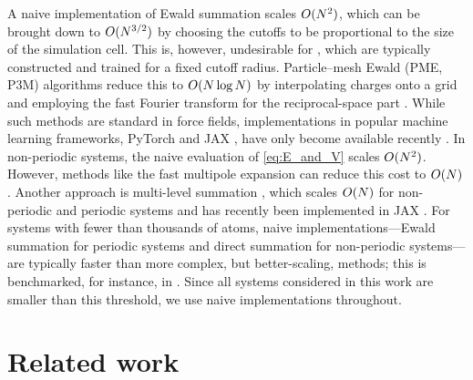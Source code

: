 \documentclass[10pt]{article} %
\begin{document}
% 
A naive implementation of Ewald summation scales $O(N^2)$, which can be brought down to $O(N^{3/2})$ by choosing the cutoffs to be proportional to the size of the simulation cell. 
This is, however, undesirable for \mlps, which are typically constructed and trained for a fixed cutoff radius.
Particle–mesh Ewald (PME, P3M) algorithms reduce this to $O(N \log N)$ by interpolating charges onto a grid and employing the fast Fourier transform for the reciprocal-space part \citep{dyp1993,he2021}.
While such methods are standard in force fields, implementations in popular machine learning frameworks, PyTorch \citep{pgmlbcklgadkydrtcsfbc2019} and JAX \citep{bfhjlmnpvwz2018}, have only become available recently \citep{lhhxrhlc2025}.
In non-periodic systems, the naive evaluation of \cref{eq:E_and_V} scales $O(N^2)$. However, methods like the fast multipole expansion can reduce this cost to $O(N)$ \citep{gr1987}. 
Another approach is multi-level summation \citep{hwpsss2015}, which scales $O(N)$ for non-periodic and periodic systems and has recently been implemented in JAX \citep{bsucm2025pre}.
For systems with fewer than thousands of atoms, naive implementations---Ewald summation for periodic systems and direct summation for non-periodic systems---are typically faster than more complex, but better-scaling, methods; this is benchmarked, for instance, in \citet{lhhxrhlc2025}. Since all systems considered in this work are smaller than this threshold, we use naive implementations throughout.

\section{Related work}
\end{document}

